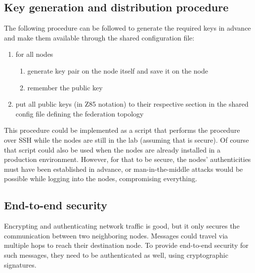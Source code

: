 \subsection{Key generation and distribution procedure}
The following procedure can be followed to generate the required keys in
advance and make them available through the shared configuration file:

\begin{enumerate}
	\item for all nodes
	\begin{enumerate}
		\item generate key pair on the node itself and save it on the
			node
		\item remember the public key
	\end{enumerate}

	\item put all public keys (in Z85 notation) to their respective section
		in the shared config file defining the federation topology
\end{enumerate}

This procedure could be implemented as a script that performs the procedure
over \gls{SSH} while the nodes are still in the
lab (assuming that is secure). Of course that script could also be used when
the nodes are already installed in a production environment. However, for that to be
secure, the nodes' authenticities must have been established in advance, or
man-in-the-middle attacks would be possible while logging into the nodes,
compromising everything.



% 
% 
% 


\subsection{End-to-end security}
Encrypting and authenticating network traffic is good, but it only secures the
communication between two neighboring nodes. Messages could travel via multiple
hops to reach their destination node. To provide end-to-end security for such
messages, they need to be authenticated as well, using cryptographic
signatures.


